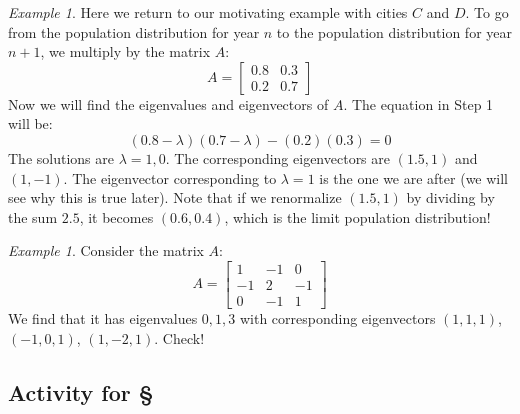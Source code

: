 \documentclass[11pt,oneside]{amsbook}
\theoremstyle{definition}
\theoremstyle{plain}
\theoremstyle{definition}
\theoremstyle{remark}
\newtheorem{example}[theorem]{Example}
\numberwithin{equation}{section}
\numberwithin{figure}{section}
\begin{document}
\begin{example}
  Here we return to our motivating example with cities $C$ and $D$. To go from the population distribution for year $n$ to the population distribution for year $n+1$, we multiply by the matrix $A$:
  \[A=\begin{bmatrix}0.8&0.3\\0.2&0.7\end{bmatrix}
  \]
  Now we will find the eigenvalues and eigenvectors of $A$. The equation in Step 1 will be:
  \[(0.8-\lambda)(0.7-\lambda)-(0.2)(0.3)=0
  \]
  The solutions are $\lambda=1,0$. The corresponding eigenvectors are $(1.5,1)$ and $(1,-1)$. The eigenvector corresponding to $\lambda=1$ is the one we are after (we will see why this is true later). Note that if we renormalize $(1.5,1)$ by dividing by the sum $2.5$, it becomes $(0.6,0.4)$, which is the limit population distribution!
\end{example}

\begin{example}
  Consider the matrix $A$:
  \[A=\begin{bmatrix}1&-1&0\\-1&2&-1\\0&-1&1\end{bmatrix}
  \]
  We find that it has eigenvalues $0,1,3$ with corresponding eigenvectors $(1,1,1)$, $(-1,0,1)$, $(1,-2,1)$. Check!
\end{example}

\newpage
\subsection*{Activity for \S \thesection}
\end{document}
